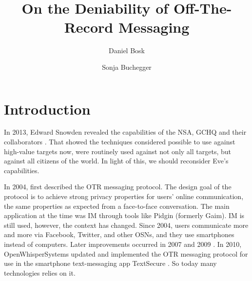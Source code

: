 \title{%
  On the Deniability of Off-The-Record Messaging
}
\author{%
  Daniel Bosk \and
  Sonja Buchegger
}

\maketitle


\acresetall
\section{Introduction}

In 2013, Edward Snowden \cite{landau2013making} revealed the capabilities of 
the \ac{NSA}, \ac{GCHQ} and their collaborators \cite[e.g.][]{nsa1,nsa2}.
That showed the techniques considered possible to use against high-value 
targets now, were routinely used against not only all targets, but against all 
citizens of the world.
In light of this, we should reconsider Eve's capabilities.

In 2004, \citeauthor{otr2004} \cite{otr2004} first described the \ac{OTR} 
messaging protocol.
The design goal of the protocol is to achieve strong privacy properties for 
users' online communication, the same properties as expected from 
a face-to-face conversation.
The main application at the time was \ac{IM} through tools like Pidgin 
\cite{pidgin} (formerly Gaim).
\ac{IM} is still used, however, the context has changed.
Since 2004, users communicate more and more via Facebook, Twitter, and other 
\acp{OSN}, and they use smartphones instead of computers.
Later improvements occurred in 2007 \cite{otr2007} and 2009 \cite{multiotr2009}.
In 2010, OpenWhisperSystems updated and implemented the \ac{OTR} messaging 
protocol for use in the smartphone text-messaging app TextSecure 
\cite{textsecure}.
So today many technologies relies on it.

